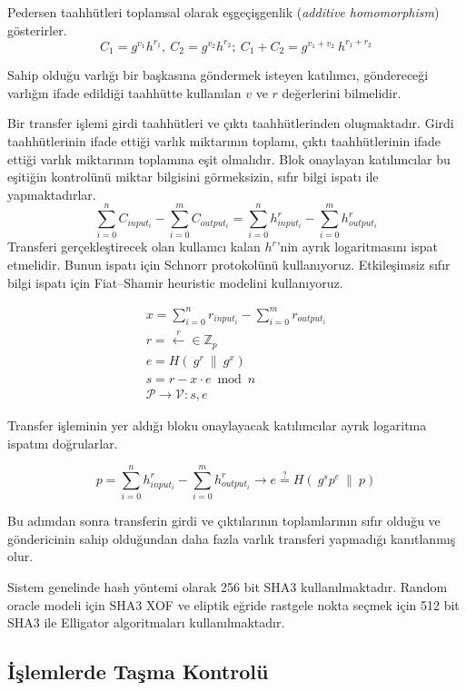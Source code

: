 \documentclass[a4paper,11pt]{article}
\begin{document}
Pedersen taahhütleri\cite{pedersen} toplamsal olarak eşgeçişgenlik (\emph{additive homomorphism}) gösterirler.
$$C_{1} =g^{v_{1}} h^{r_{1}} ,\ C_{2} =g^{v_{2}} h^{r_{2}};\ C_{1} +C_{2} =g^{v_{1} +v_{2}} \ h^{r_{1} +r_{2}}$$

Sahip olduğu varlığı bir başkasına göndermek isteyen katılımcı, göndereceği varlığın ifade edildiği taahhütte kullanılan $v$ ve $r$ değerlerini bilmelidir.

Bir transfer işlemi girdi taahhütleri ve çıktı taahhütlerinden oluşmaktadır. Girdi taahhütlerinin ifade ettiği varlık miktarının toplamı, çıktı taahhütlerinin ifade ettiği varlık miktarının toplamına eşit olmalıdır. Blok onaylayan katılımcılar bu eşitiğin kontrolünü miktar bilgisini görmeksizin, sıfır bilgi ispatı ile yapmaktadırlar.
$$\sum ^{n}_{i=0} C_{input_{i}} -\sum ^{m}_{i=0} C_{output_{i}} =\sum ^{n}_{i=0} h^{r}_{input_{i}} -\sum ^{m}_{i=0} h^{r}_{output_{i}}$$
Transferi gerçekleştirecek olan kullanıcı kalan $h^{r}$'nin ayrık logaritmasını ispat etmelidir. Bunun ispatı için Schnorr\cite{schnorr} protokolünü kullanıyoruz. Etkileşimsiz sıfır bilgi ispatı için Fiat–Shamir heuristic\cite{fiatshamir} modelini kullanıyoruz.

$$
\begin{array}{l}
x=\sum ^{n}_{i=0} r_{input_{i}} -\sum ^{m}_{i=0} r_{output_{i}}\\
r=\xleftarrow{r} \in \mathbb{Z}_{p}\\
e=H( \: g^{r}\: \| \: g^{x} ) \\
s=r-x\cdot e\bmod n\ \\
\mathcal{P} \rightarrow \mathcal{V}: s, e
\end{array}
$$

Transfer işleminin yer aldığı bloku onaylayacak katılımcılar ayrık logaritma ispatını doğrularlar.

$$p=\sum ^{n}_{i=0} h^{r}_{input_{i}} -\sum ^{m}_{i=0} h^{r}_{output_{i}} \rightarrow e \stackrel{?}{=} H( \: g^{s} p^{e}\: \| \: p )$$

Bu adımdan sonra transferin girdi ve çıktılarının toplamlarının sıfır olduğu ve göndericinin sahip olduğundan daha fazla varlık transferi yapmadığı kanıtlanmış olur.

Sistem genelinde hash yöntemi olarak 256 bit SHA3 kullanılmaktadır. Random oracle modeli için SHA3 XOF ve eliptik eğride rastgele nokta seçmek için 512 bit SHA3 ile Elligator\cite{elligator} algoritmaları kullanılmaktadır.

\subsection{İşlemlerde Taşma Kontrolü}
\end{document}

